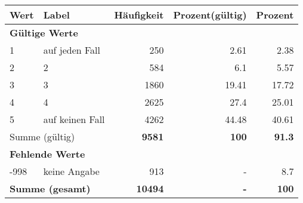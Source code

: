      \begin{longtable}{lXrrr}
     \toprule
     \textbf{Wert} & \textbf{Label} & \textbf{Häufigkeit} & \textbf{Prozent(gültig)} & \textbf{Prozent} \\
     \endhead
     \midrule
     \multicolumn{5}{l}{\textbf{Gültige Werte}}\\

     1 &
     \multicolumn{1}{X}{ auf jeden Fall   } &


       \num{250} &
       \num[round-mode=places,round-precision=2]{2.61} &
         \num[round-mode=places,round-precision=2]{2.38} \\

     2 &
     \multicolumn{1}{X}{ 2   } &


       \num{584} &
       \num[round-mode=places,round-precision=2]{6.1} &
         \num[round-mode=places,round-precision=2]{5.57} \\

     3 &
     \multicolumn{1}{X}{ 3   } &


       \num{1860} &
       \num[round-mode=places,round-precision=2]{19.41} &
         \num[round-mode=places,round-precision=2]{17.72} \\

     4 &
     \multicolumn{1}{X}{ 4   } &


       \num{2625} &
       \num[round-mode=places,round-precision=2]{27.4} &
         \num[round-mode=places,round-precision=2]{25.01} \\

     5 &
     \multicolumn{1}{X}{ auf keinen Fall   } &


       \num{4262} &
       \num[round-mode=places,round-precision=2]{44.48} &
         \num[round-mode=places,round-precision=2]{40.61} \\
     \midrule
     \multicolumn{2}{l}{Summe (gültig)} &
       \textbf{\num{9581}} &
     \textbf{\num{100}} &
       \textbf{\num[round-mode=places,round-precision=2]{91.3}} \\
     \multicolumn{5}{l}{\textbf{Fehlende Werte}}\\
       -998 &
       keine Angabe &
         \num{913} &
        - &
         \num[round-mode=places,round-precision=2]{8.7} \\
     \midrule
     \multicolumn{2}{l}{\textbf{Summe (gesamt)}} &
          \textbf{\num{10494}} &
        \textbf{-} &
        \textbf{\num{100}} \\
     \bottomrule
     \end{longtable}
     

